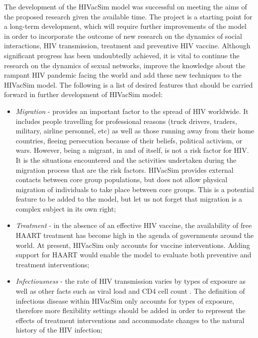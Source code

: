 The development of the HIVacSim model was successful on meeting the aims of the proposed
research given the available time. The project is a starting point for a long-term
development, which will require further improvements of the model in order to incorporate
the outcome of new research on the dynamics of social interactions, HIV transmission,
treatment and preventive HIV vaccine. Although significant progress has been undoubtedly
achieved, it is vital to continue the research on the dynamics of sexual networks,
improve the knowledge about the rampant HIV pandemic facing the world and add these new
techniques to the HIVacSim model. The following is a list of desired features that should
be carried forward in further development of HIVacSim model:
\parskip=0pt
\begin{itemize}
    \item \emph{Migration} - provides an important factor to the spread of HIV worldwide.
    It includes people travelling for professional reasons (truck drivers, traders,
    military, airline personnel, etc) as well as those running away from their home
    countries, fleeing persecution because of their beliefs, political activism, or wars.
    However, being a migrant, in and of itself, is not a risk factor for HIV. It is the
    situations encountered and the activities undertaken during the migration process that
    are the risk factors. HIVacSim provides external contacts between core group
    populations, but does not allow physical migration of individuals to take place
    between core groups. This is a potential feature to be added to the model, but let
    us not forget that migration is a complex subject in its own right;

    \item \emph{Treatment} - in the absence of an effective HIV vaccine, the availability
    of free HAART treatment has become high in the agenda of governments around the world.
    At present, HIVacSim only accounts for vaccine interventions. Adding support
    for HAART would enable the model to evaluate both preventive and treatment interventions;

    \item \emph{Infectiousness} - the rate of HIV transmission varies by types of exposure
    as well as other facts such as viral load and CD4 cell count \cite{Lifson1989,Lyles2000}. The definition of
    infectious disease within HIVacSim only accounts for types of exposure, therefore more
    flexibility settings should be added in order to represent the effects of treatment
    interventions and accommodate changes to the natural history of the HIV infection;


\end{itemize}
